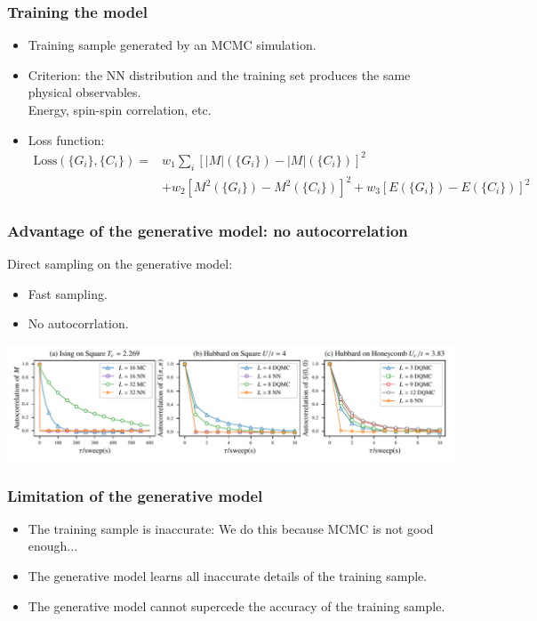 \documentclass[xcolor=table, 10pt, aspectratio=169, ignorenonframetext]{beamer}
\begin{document}
\begin{frame}
  \frametitle{Training the model}
  \begin{itemize}
  \item Training sample generated by an MCMC simulation.
  \item Criterion: the NN distribution and the training set produces the same physical observables.\\
    Energy, spin-spin correlation, etc.
  \item Loss function:
    \begin{align*}
      \text{Loss}(\{G_i\},\{C_i\})=&w_1\sum_i[|M|(\{G_i\})-|M|(\{C_i\})]^2\\
      &+w_2 [M^2(\{G_i\})-M^2(\{C_i\})]^2+w_3 [E(\{G_i\})-E(\{C_i\})]^2
    \end{align*}

  \end{itemize}
\end{frame}

\begin{frame}
  \frametitle{Advantage of the generative model: no autocorrelation}
  Direct sampling on the generative model:
  \begin{itemize}
  \item Fast sampling.
  \item No autocorrlation.
  \end{itemize}
  \begin{center}
    \includegraphics{autocorr-a}
  \end{center}
\end{frame}

\begin{frame}
	\frametitle{Limitation of the generative model}
	\begin{itemize}
		\item The training sample is inaccurate: We do this because MCMC is not good enough...
		\item The generative model learns all inaccurate details of the training sample.
		\item The generative model cannot supercede the accuracy of the training sample.
	\end{itemize}
\end{frame}
\end{document}
